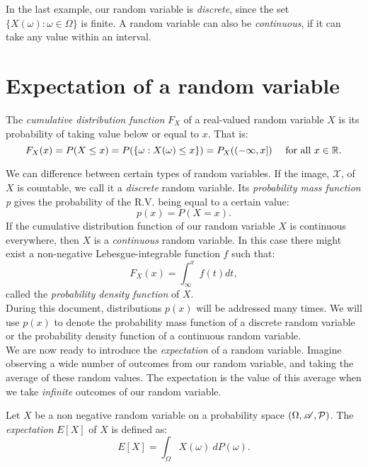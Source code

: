In the last example, our random variable is \emph{discrete}, since the set $\{X(\omega): \omega \in \Omega\}$ is finite.
 A random variable can also be \emph{continuous}, if it can take any value within an interval.\\


\section{Expectation of a random variable}

\begin{ndef}
The \emph{cumulative distribution function } $F_X$ of a real-valued random variable $X$ is its probability of taking value below or equal to $x$. That is:
$$
F_X(x) = P(X \leq x) = P(\{\omega : X(\omega) \leq x\}) = P_X((-\infty,x]) \quad \text{ for all } x \in \mathbb{R} .
$$
\end{ndef}

We can difference between certain types of random variables. If the image, $\mathcal X$, of $X$ is countable, we call it a \emph{discrete} random variable. Its \emph{probability mass function p} gives the
probability of the R.V. being equal to a certain value:
$$
p(x) = P(X = x).
$$
If the cumulative distribution function of our random variable $X$ is continuous everywhere, then $X$ is a \emph{continuous} random variable.
 In this case there might exist a non-negative Lebesgue-integrable function $f$ such that:
$$
F_X(x) = \int_{\infty}^x f(t) dt,
$$
called the \emph{probability density function} of $X$.\\

During this document, distributions $p(x)$ will be addressed many times. We will use $p(x)$ to denote the probability mass function of a discrete random variable or the probability density function of a continuous random variable. \\

We are now ready to introduce the \emph{expectation} of a random variable. Imagine observing a wide number of outcomes from our random variable, and taking the average of these random values. The expectation is the value of this average when we 
take \emph{infinite} outcomes of our random variable.

\begin{ndef}\label{def:expectation}
Let $X$ be a non negative random variable on a probability space $(\Omega,\mathscr{A},\mathcal{P})$. The \emph{expectation} $E[X]$ of $X$ is defined as:
$$
E[X] = \int_\Omega X(\omega) \ dP(\omega).
$$
\end{ndef}

